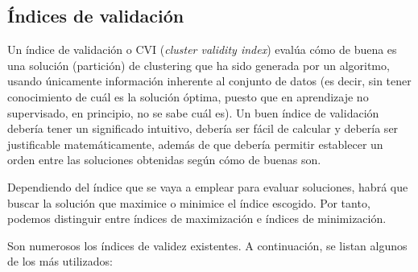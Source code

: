 \subsection{Índices de validación}\label{subsct:cvi}

Un índice de validación o CVI (\emph{cluster validity index}) evalúa cómo de buena es una solución (partición) de clustering que ha sido generada por un algoritmo, usando únicamente información inherente al conjunto de datos (es decir, sin tener conocimiento de cuál es la solución óptima, puesto que en aprendizaje no supervisado, en principio, no se sabe cuál es). Un buen índice de validación debería tener un significado intuitivo, debería ser fácil de calcular y debería ser justificable matemáticamente, además de que debería permitir establecer un orden entre las soluciones obtenidas según cómo de buenas son.

Dependiendo del índice que se vaya a emplear para evaluar soluciones, habrá que buscar la solución que maximice o minimice el índice escogido. Por tanto, podemos distinguir entre índices de maximización e índices de minimización.

Son numerosos los índices de validez existentes. A continuación, se listan algunos de los más utilizados:

